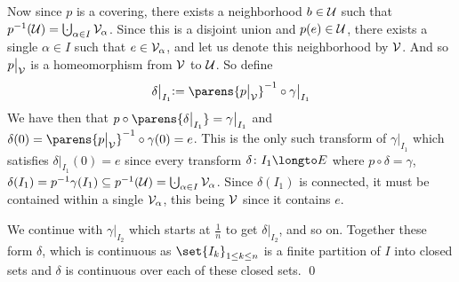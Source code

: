 Now since $p$ is a covering, there exists a neighborhood $b\in{\cal U}$ such that $p^{-1}({\cal U})=\bigdcup_{\alpha\in I}{\cal V}_\alpha$.
Since this is a disjoint union and $p(e)\in{\cal U}$, there exists a single $\alpha\in I$ such that $e\in{\cal V}_\alpha$, and let us denote this neighborhood by ${\cal V}$.
And so $p\bigl|_{\cal V}$ is a homeomorphism from ${\cal V}$ to ${\cal U}$.
So define
$$ \delta\bigl|_{I_1}\coloneqq \parens{p\bigl|_{\cal V}}^{-1}\circ\gamma\bigl|_{I_1} $$
We have then that $p\circ\parens{\delta\bigl|_{I_1}}=\gamma\bigl|_{I_1}$ and $\delta(0)=\parens{p\bigl|_{\cal V}}^{-1}\circ\gamma(0)=e$.
This is the only such transform of $\gamma\bigl|_{I_1}$ which satisfies $\delta\bigl|_{I_1}(0)=e$ since every transform $\delta\colon I_1\longto E$ where $p\circ\delta=\gamma$,
$\delta(I_1)=p^{-1}\gamma(I_1)\subseteq p^{-1}({\cal U})=\bigdcup_{\alpha\in I}{\cal V}_\alpha$.
Since $\delta(I_1)$ is connected, it must be contained within a single ${\cal V}_\alpha$, this being ${\cal V}$ since it contains $e$.

We continue with $\gamma\bigl|_{I_2}$ which starts at $\frac1n$ to get $\delta\bigl|_{I_2}$, and so on.
Together these form $\delta$, which is continuous as $\set{I_k}_{1\leq k\leq n}$ is a finite partition of $I$ into closed sets and $\delta$ is continuous over each of these closed sets.
\qed

\bye

